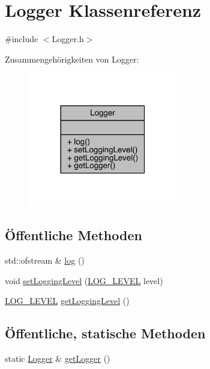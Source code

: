 \hypertarget{class_logger}{}\section{Logger Klassenreferenz}
\label{class_logger}


{\ttfamily \#include $<$Logger.\+h$>$}



Zusammengehörigkeiten von Logger\+:\nopagebreak
\begin{figure}[H]
\begin{center}
\leavevmode
\includegraphics[width=185pt]{class_logger__coll__graph}
\end{center}
\end{figure}
\subsection*{Öffentliche Methoden}
\begin{DoxyCompactItemize}
\item 
std\+::ofstream \& \hyperlink{class_logger_af8a0b7a8939294ceb2cef39c358dfa9c}{log} ()
\item 
void \hyperlink{class_logger_a3759fa32a4f0c7255f61a2ce6484c194}{set\+Logging\+Level} (\hyperlink{_logger_8h_aa5a9053636a30269210c54e734e0d583}{L\+O\+G\+\_\+\+L\+E\+V\+EL} level)
\item 
\hyperlink{_logger_8h_aa5a9053636a30269210c54e734e0d583}{L\+O\+G\+\_\+\+L\+E\+V\+EL} \hyperlink{class_logger_acce532a939622d2b5c919f5f67236564}{get\+Logging\+Level} ()
\end{DoxyCompactItemize}
\subsection*{Öffentliche, statische Methoden}
\begin{DoxyCompactItemize}
\item 
static \hyperlink{class_logger}{Logger} \& \hyperlink{class_logger_afa2765f0a04e7a50e1efc38cce67a763}{get\+Logger} ()
\end{DoxyCompactItemize}


